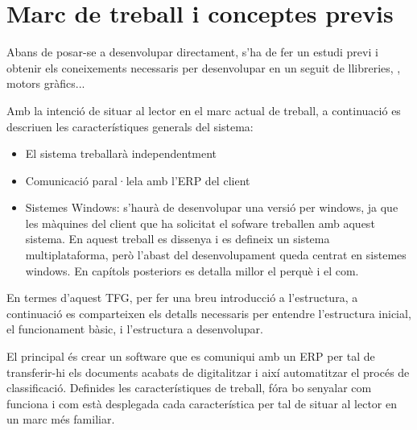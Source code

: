 \documentclass[letterpaper,11pt,catalan]{sphinxmanual}
\begin{document}
\chapter{Marc de treball i conceptes previs}
\label{\detokenize{index:marc-de-treball-i-conceptes-previs}}
Abans de posar-se a desenvolupar directament, s'ha de fer un estudi previ i obtenir els coneixements
necessaris per desenvolupar en un seguit de llibreries, , motors gràfics...

Amb la intenció de situar al lector en el marc actual de treball, a continuació es descriuen
les característiques generals del sistema:
\begin{itemize}
\item {} 
El sistema treballarà independentment

\item {} 
Comunicació paral·lela amb l'ERP del client

\item {} 
Sistemes Windows: s'haurà de desenvolupar una versió per windows, ja que les màquines
del client que ha solicitat el sofware treballen amb aquest sistema. En aquest treball
es dissenya i es defineix un sistema multiplataforma, però l'abast del desenvolupament
queda centrat en sistemes windows. En capítols posteriors es detalla millor el perquè i el com.

\end{itemize}

En termes d'aquest TFG, per fer una breu introducció a l'estructura, a continuació es comparteixen els
detalls necessaris per entendre l'estructura inicial, el funcionament bàsic, i l'estructura a desenvolupar.

El principal és crear un software que es comuniqui amb un ERP per tal de transferir-hi els documents acabats
de digitalitzar i així automatitzar el procés de classificació.
Definides les característiques de treball, fóra bo senyalar com funciona i com està
desplegada cada característica per tal de situar al lector en un marc més familiar.
\end{document}
